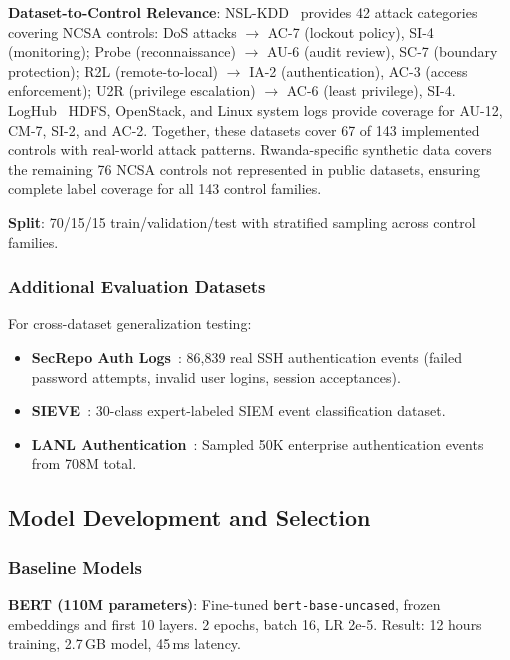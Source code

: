 \documentclass[futureinternet,article,submit,pdftex,moreauthors]{Definitions/mdpi}
\begin{document}
\textbf{Dataset-to-Control Relevance}: NSL-KDD~\cite{nslkdd} provides 42 attack categories
covering NCSA controls: DoS attacks $\rightarrow$ AC-7 (lockout policy), SI-4 (monitoring);
Probe (reconnaissance) $\rightarrow$ AU-6 (audit review), SC-7 (boundary protection);
R2L (remote-to-local) $\rightarrow$ IA-2 (authentication), AC-3 (access enforcement);
U2R (privilege escalation) $\rightarrow$ AC-6 (least privilege), SI-4. LogHub~\cite{loghub}
HDFS, OpenStack, and Linux system logs provide coverage for AU-12, CM-7, SI-2, and AC-2.
Together, these datasets cover 67 of 143 implemented controls with real-world attack patterns.
Rwanda-specific synthetic data covers the remaining 76 NCSA controls not represented in
public datasets, ensuring complete label coverage for all 143 control families.

\textbf{Split}: 70/15/15 train/validation/test with stratified sampling across control
families.

\subsubsection{Additional Evaluation Datasets}

For cross-dataset generalization testing:
\begin{itemize}
\item \textbf{SecRepo Auth Logs}~\cite{secrepo}: 86{,}839 real SSH authentication events
(failed password attempts, invalid user logins, session acceptances).
\item \textbf{SIEVE}~\cite{sieve_dataset}: 30-class expert-labeled SIEM event classification
dataset.
\item \textbf{LANL Authentication}~\cite{lanl_auth}: Sampled 50K enterprise authentication
events from 708M total.
\end{itemize}

\subsection{Model Development and Selection}

\subsubsection{Baseline Models}

\textbf{BERT (110M parameters)}: Fine-tuned \texttt{bert-base-uncased}, frozen embeddings
and first 10 layers. 2 epochs, batch 16, LR 2e-5. Result: 12 hours training, 2.7\,GB model,
45\,ms latency.
\end{document}
